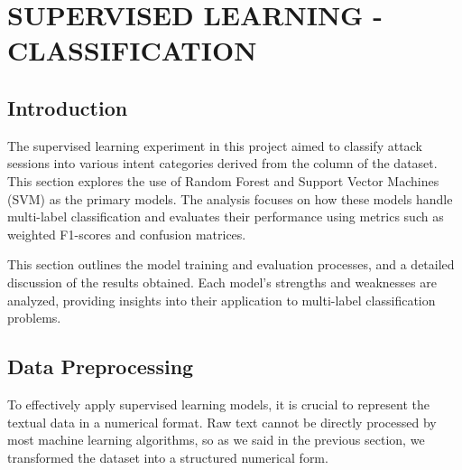 

\section{SUPERVISED LEARNING - CLASSIFICATION}


    \subsection{Introduction}
    
        The supervised learning experiment in this project aimed to classify attack sessions into various intent categories derived from the  column of the dataset. This section explores the use of Random Forest and Support Vector Machines (SVM) as the primary models. The analysis focuses on how these models handle multi-label classification and evaluates their performance using metrics such as weighted F1-scores and confusion matrices.

        This section outlines the model training and evaluation processes, and a detailed discussion of the results obtained. Each model's strengths and weaknesses are analyzed, providing insights into their application to multi-label classification problems.

    \subsection{Data Preprocessing}
    
        To effectively apply supervised learning models, it is crucial to represent the textual data in a numerical format. Raw text cannot be directly processed by most machine learning algorithms, so as we said in the previous section, we transformed the dataset into a structured numerical form.
    
